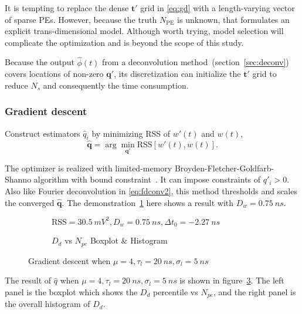It is tempting to replace the dense $\bm{t'}$ grid in \eqref{eq:gd} with a length-varying vector of sparse PEs. However, because the truth $N_\mathrm{PE}$ is unknown, that formulates an explicit trans-dimensional model.  Although worth trying, model selection will complicate the optimization and is beyond the scope of this study.

Because the output $\hat{\phi}(t)$ from a deconvolution method~(section~\ref{sec:deconv}) covers locations of non-zero $\bm{q}'$, its discretization can initialize the $\bm{t}'$ grid to reduce $N_s$ and consequently the time consumption.

\subsubsection{Gradient descent}

Construct estimators $\hat{q}_i$ by minimizing RSS of $w'(t)$ and $w(t)$,
\begin{equation}
  \label{eq:gd-q}
  \bm{\hat{q}} = \arg \underset{\bm{q'}}{\min} \mathrm{RSS}\left[w'(t),w(t)\right].
\end{equation}

The optimizer is realized with limited-memory Broyden-Fletcher-Goldfarb-Shanno algorithm with bound constraint~\cite{byrd_limited_1995}.  It can impose constraints of $q'_i > 0$. Also like Fourier deconvolution in \eqref{eq:fdconv2}, this method thresholds and scales the converged $\bm{\hat{q}}$. The demonstration~\ref{fig:fitting} here shows a result with $D_w = \SI{0.75}{ns}$.

\begin{figure}[H]
  \begin{subfigure}{.5\textwidth}
    \centering
    \resizebox{\textwidth}{!}{}
    \caption{\label{fig:fitting}$\mathrm{RSS}=\SI{30.5}{mV^2},D_w=\SI{0.75}{ns},\Delta{t_0}=\SI{-2.27}{ns}$}
  \end{subfigure}
  \begin{subfigure}{.5\textwidth}
    \centering
    \resizebox{\textwidth}{!}{}
    \caption{\label{fig:fitting-npe} $D_d$ vs $N_{pe}$ Boxplot \& Histogram}
  \end{subfigure}
  \caption{Gradient descent when $\mu=4, \tau_l=\SI{20}{ns}, \sigma_l=\SI{5}{ns}$}
\end{figure}

The result of $\hat{q}$ when $\mu=4, \tau_l=\SI{20}{ns}, \sigma_l=\SI{5}{ns}$ is shown in figure~\ref{fig:fitting-npe}. The left panel is the boxplot which shows the $D_d$ percentile vs $N_{pe}$, and the right panel is the overall histogram of $D_d$. 

